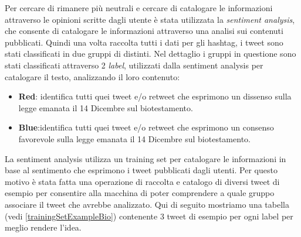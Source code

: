 Per cercare di rimanere più neutrali e cercare di catalogare le informazioni attraverso le opinioni scritte dagli utente è stata utilizzata la \textit{sentiment analysis}, che consente di catalogare le informazioni attraverso una analisi sui contenuti pubblicati. Quindi una volta raccolta tutti i dati per gli hashtag, i tweet sono stati classificati in due gruppi di distinti.
Nel dettaglio i gruppi in questione sono stati classificati attraverso 2 \textit{label}, utilizzati dalla sentiment analysis per catalogare il testo, analizzando il loro contenuto:
\begin{itemize}
\item \textbf{Red}: identifica tutti quei tweet e/o retweet che esprimono un dissenso sulla legge emanata il 14 Dicembre sul biotestamento.
\item \textbf{Blue}:identifica tutti quei tweet e/o retweet che esprimono un consenso favorevole sulla legge emanata il 14 Dicembre sul biotestamento.
\end{itemize}
La sentiment analysis utilizza un training set per catalogare le informazioni in base al sentimento che esprimono i tweet pubblicati dagli utenti. Per questo motivo è stata fatta una operazione di raccolta e catalogo di diversi tweet di esempio per consentire alla macchina di poter comprendere a quale gruppo associare il tweet che avrebbe analizzato.
Qui di seguito mostriamo una tabella (vedi \ref{trainingSetExampleBio}) contenente 3 tweet di esempio per ogni label per meglio rendere l'idea.

